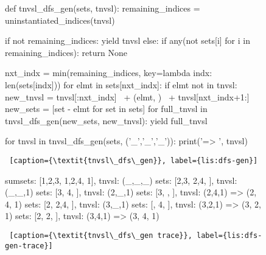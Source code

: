 \begin{figure}[htb]
    \centering
\begin{minipage}[c]{0.45\textwidth}
\begin{python1}  
def tnvsl_dfs_gen(sets, tnvsl):
  remaining_indices = uninstantiated_indices(tnvsl)

  if not remaining_indices: yield tnvsl
  else:
    if any(not sets[i] for i in remaining_indices):
      return None
      
    nxt_indx = min(remaining_indices,
                   key=lambda indx: len(sets[indx]))
    for elmt in sets[nxt_indx]:
      if elmt not in tnvsl:
        new_tnvsl = tnvsl[:nxt_indx] \
                    + (elmt, ) \
                    + tnvsl[nxt_indx+1:]
        new_sets = [set - {elmt} for set in sets]
        for full_tnvsl in tnvsl_dfs_gen(new_sets, 
                                        new_tnvsl):
          yield full_tnvsl


for tnvsl in tnvsl_dfs_gen(sets, ('_','_','_')):
    print('=> ', tnvsl)
\end{python1}\linv
\begin{lstlisting} [caption={\textit{tnvsl\_dfs\_gen}}, label={lis:dfs-gen}]
\end{lstlisting}


\begin{python1}  
sumsets: [{1,2,3}, {1,2,4}, {1}], tnvsl: (_,_,_)
  sets: [{2,3}, {2,4}, {}], tnvsl: (_,_,1)
    sets: [{3}, {4}, {}], tnvsl: (2,_,1)
      sets: [{3}, {}, {}], tnvsl: (2,4,1)
=>  (2, 4, 1)
    sets: [{2}, {2,4}, {}], tnvsl: (3,_,1)
      sets: [{}, {4}, {}], tnvsl: (3,2,1)
=>  (3, 2, 1)
      sets: [{2}, {2}, {}], tnvsl: (3,4,1)
=>  (3, 4, 1)
\end{python1}\linv
\begin{lstlisting} [caption={\textit{tnvsl\_dfs\_gen trace}}, label={lis:dfs-gen-trace}]
\end{lstlisting}
\end{minipage}\linv
\end{figure}

